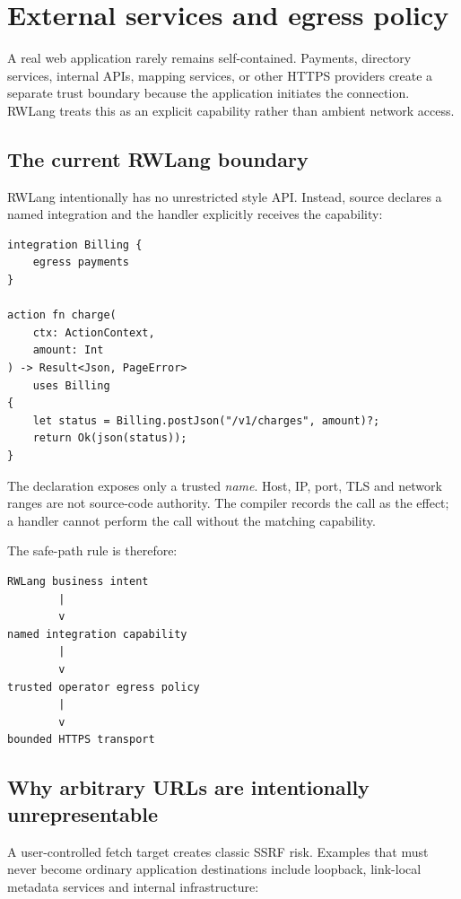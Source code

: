 \chapter{External services and egress policy}

A real web application rarely remains self-contained. Payments, directory services, internal APIs, mapping services, or other HTTPS providers create a separate trust boundary because the application initiates the connection. RWLang treats this as an explicit capability rather than ambient network access.

\section{The current RWLang boundary}

RWLang intentionally has no unrestricted  style API. Instead, source declares a named integration and the handler explicitly receives the capability:

\begin{lstlisting}[language=RWLang]
integration Billing {
    egress payments
}

action fn charge(
    ctx: ActionContext,
    amount: Int
) -> Result<Json, PageError>
    uses Billing
{
    let status = Billing.postJson("/v1/charges", amount)?;
    return Ok(json(status));
}
\end{lstlisting}

The declaration exposes only a trusted \emph{name}. Host, IP, port, TLS and network ranges are not source-code authority. The compiler records the call as the  effect; a handler cannot perform the call without the matching  capability.

The safe-path rule is therefore:

\begin{lstlisting}
RWLang business intent
        |
        v
named integration capability
        |
        v
trusted operator egress policy
        |
        v
bounded HTTPS transport
\end{lstlisting}

\section{Why arbitrary URLs are intentionally unrepresentable}

A user-controlled fetch target creates classic SSRF risk. Examples that must never become ordinary application destinations include loopback, link-local metadata services and internal infrastructure:

